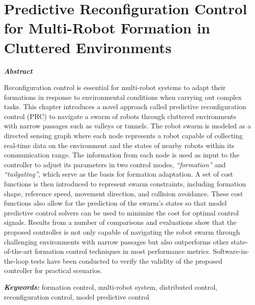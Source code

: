 \chapter{Predictive Reconfiguration Control for Multi-Robot Formation in Cluttered Environments}\label{paper3}

\vspace{1cm}

\noindent\textit{\textbf{Abstract}}

Reconfiguration control is essential for multi-robot systems to adapt their formations in response to environmental conditions when carrying out complex tasks. This chapter introduces a novel approach called predictive reconfiguration control (PRC) to navigate a swarm of robots through cluttered environments with narrow passages such as valleys or tunnels. The robot swarm is modeled as a directed sensing graph where each node represents a robot capable of collecting real-time data on the environment and the states of nearby robots within its communication range. The information from each node is used as input to the controller to adjust its parameters in two control modes, \textit{``formation''} and \textit{``tailgating''}, which serve as the basis for formation adaptation. A set of cost functions is then introduced to represent swarm constraints, including formation shape, reference speed, movement direction, and collision avoidance. These cost functions also allow for the prediction of the swarm's states so that model predictive control solvers can be used to minimize the cost for optimal control signals. Results from a number of comparisons and evaluations show that the proposed controller is not only capable of navigating the robot swarm through challenging environments with narrow passages but also outperforms other state-of-the-art formation control techniques in most performance metrics. Software-in-the-loop tests have been conducted to verify the validity of the proposed controller for practical scenarios.

\noindent\textbf{\textit{Keywords:}}
formation control, multi-robot system, distributed control, reconfiguration control, model predictive control







